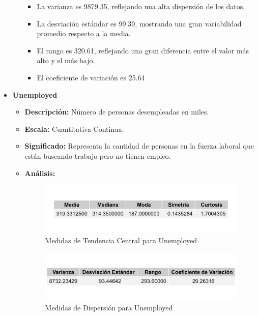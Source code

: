 \documentclass{article}
\begin{document}
\begin{itemize}
\begin{itemize}
\begin{itemize}
                \item La varianza es 9879.35, reflejando una alta dispersión de los datos.
                \item La desviación estándar es 99.39, mostrando una gran variabilidad promedio respecto a la media.
                \item El rango es 320.61, reflejando una gran diferencia entre el valor más alto y el más bajo.
                \item El coeficiente de variación es 25.64%
            \end{itemize}
    \end{itemize}
    
    \item \textbf{Unemployed}
    \begin{itemize}
        \item \textbf{Descripción:} Número de personas desempleadas en miles.
        \item \textbf{Escala:} Cuantitativa Continua.
        \item \textbf{Significado:} Representa la cantidad de personas en la fuerza laboral que están buscando trabajo pero no tienen empleo.
        \item \textbf{Análisis:} 
        \begin{figure}[H]
            \centering
            \includegraphics[width=\textwidth]{MTC/Unemployed_central.png}
            \caption{Medidas de Tendencia Central para Unemployed}
        \end{figure}
        \begin{figure}[H]
            \centering
            \includegraphics[width=\textwidth]{MTC/Unemployed_dispersion.png}
            \caption{Medidas de Dispersión para Unemployed}

\end{figure}
\end{itemize}
\end{itemize}
\end{document}
